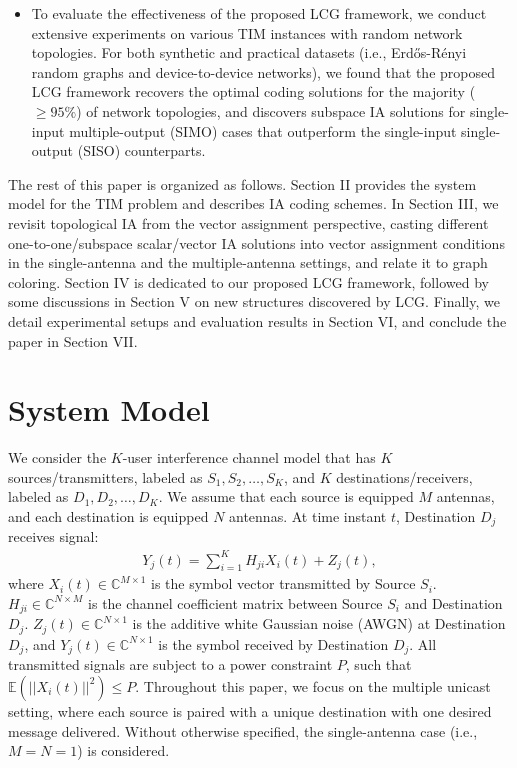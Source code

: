 \documentclass[a4paper,journal]{IEEEtran}
\def\C {\mathbb{C}}
\begin{document}
\begin{itemize}
\item
To evaluate the effectiveness of the proposed LCG framework, we conduct extensive experiments on various TIM instances with random network topologies.
For both synthetic and practical datasets (i.e., Erdős-Rényi random graphs and device-to-device networks), we found that the proposed LCG framework recovers the optimal coding solutions for the majority ($\ge 95\%$) of network topologies, and discovers subspace IA solutions for single-input multiple-output (SIMO) cases that outperform the single-input single-output (SISO) counterparts.
\end{itemize}

The rest of this paper is organized as follows. Section II provides the system model for the TIM problem and describes IA coding schemes. In Section III, we revisit topological IA from the vector assignment perspective, casting different one-to-one/subspace scalar/vector IA solutions into vector assignment conditions in the single-antenna and the multiple-antenna settings, and relate it to graph coloring. 
Section IV is dedicated to our proposed LCG framework, followed by some discussions in Section V on new structures discovered by LCG.
Finally, we detail experimental setups and evaluation results in Section VI, and conclude the paper in Section VII.

\section{System Model}
We consider the $K$-user interference channel model that has $K$ sources/transmitters, labeled as $S_1,S_2,\dots,S_K$, and $K$ destinations/receivers, labeled as $D_1,D_2,\dots,D_K$. We assume that each source is equipped $M$ antennas, and each destination is equipped $N$ antennas. At time instant $t$,  
Destination $D_j$ receives signal:%
\begin{align}
Y_j(t) = \sum_{i=1}^K H_{ji}X_i(t)+Z_j(t),
\end{align}
where $X_i(t)\in \C^{M \times 1}$ is the symbol vector transmitted by Source $S_i$. $H_{ji}\in \C^{N \times M}$ is the channel coefficient matrix between Source $S_i$ and Destination $D_j$. $Z_j(t)\in \C^{N \times 1}$ is the additive white Gaussian noise (AWGN) at Destination $D_j$, and $Y_j(t)\in \C^{N\times 1}$ is the symbol received by Destination $D_j$. All transmitted signals are subject to a power constraint $P$, such that $\mathbb{E}(||X_i(t)||^2)\leq P$. Throughout this paper, we focus on the multiple unicast setting, where each source is paired with a unique destination with one desired message delivered. Without otherwise specified, the single-antenna case (i.e., $M=N=1$) is considered.
\end{document}

